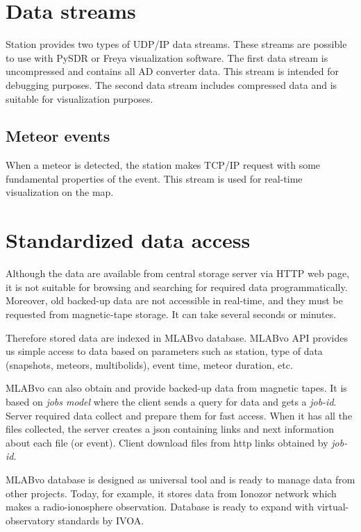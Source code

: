 \documentclass[10pt,a4paper,twoside,dvips]{article}
\begin{document}
\begin{IMCpaper}
\section{Data streams}
Station provides two types of UDP/IP data streams. These streams are possible to use with PySDR or Freya visualization software. The first data stream is uncompressed and contains all AD converter data. This stream is intended for debugging purposes. The second data stream includes compressed data and is suitable for visualization purposes.                                              

\subsection{Meteor events}
When a meteor is detected, the station makes TCP/IP request with some fundamental properties of the event. This stream is used for real-time visualization on the map.                                                                                        

\section{Standardized data access}
Although the data are available from central storage server via HTTP web page, it is not suitable for browsing and searching for required data programmatically. Moreover, old backed-up data are not accessible in real-time, and they must be requested from magnetic-tape storage. It can take several seconds or minutes.

Therefore stored data are indexed in MLABvo database. MLABvo API provides us simple access to data based on parameters such as station, type of data (snapshots, meteors, multibolids), event time, meteor duration, etc.                   

MLABvo can also obtain and provide backed-up data from magnetic tapes. It is based on \textit{jobs model} where the client sends a query for data and gets a \textit{job-id}. Server required data collect and prepare them for fast access. When it has all the files collected, the server creates a json containing links and next information about each file (or event). Client download files from http links obtained by \textit{job-id}.

MLABvo database is designed as universal tool and is ready to manage data from other projects. Today, for example, it stores data from Ionozor network which makes a radio-ionosphere observation. Database is ready to expand with virtual-observatory standards by IVOA. 


\end{IMCpaper}
\end{document}
